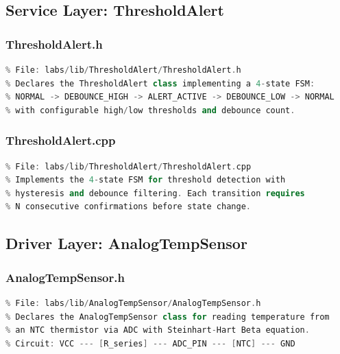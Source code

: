 \subsection{Service Layer: ThresholdAlert}

\subsubsection{ThresholdAlert.h}
\begin{lstlisting}[language=C++, caption=ThresholdAlert.h --- Hysteresis-Based Threshold Alert Interface, label=lst:appendix_threshold_alert_h]
% [Full source code - see GitHub repository]
% File: labs/lib/ThresholdAlert/ThresholdAlert.h
% Declares the ThresholdAlert class implementing a 4-state FSM:
% NORMAL -> DEBOUNCE_HIGH -> ALERT_ACTIVE -> DEBOUNCE_LOW -> NORMAL
% with configurable high/low thresholds and debounce count.
\end{lstlisting}

\subsubsection{ThresholdAlert.cpp}
\begin{lstlisting}[language=C++, caption=ThresholdAlert.cpp --- Hysteresis-Based Threshold Alert Implementation, label=lst:appendix_threshold_alert_cpp]
% [Full source code - see GitHub repository]
% File: labs/lib/ThresholdAlert/ThresholdAlert.cpp
% Implements the 4-state FSM for threshold detection with
% hysteresis and debounce filtering. Each transition requires
% N consecutive confirmations before state change.
\end{lstlisting}


\subsection{Driver Layer: AnalogTempSensor}

\subsubsection{AnalogTempSensor.h}
\begin{lstlisting}[language=C++, caption=AnalogTempSensor.h --- NTC Thermistor Driver Interface, label=lst:appendix_analog_temp_h]
% [Full source code - see GitHub repository]
% File: labs/lib/AnalogTempSensor/AnalogTempSensor.h
% Declares the AnalogTempSensor class for reading temperature from
% an NTC thermistor via ADC with Steinhart-Hart Beta equation.
% Circuit: VCC --- [R_series] --- ADC_PIN --- [NTC] --- GND
\end{lstlisting}

